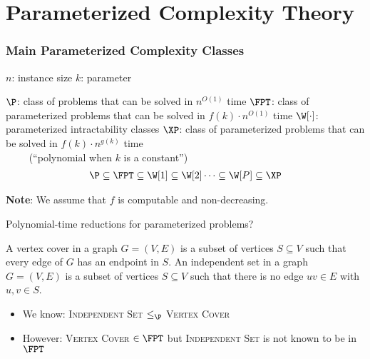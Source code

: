 



\section{Parameterized Complexity Theory}

\begin{frame}
	\frametitle{Main Parameterized Complexity Classes}
	
	\noindent
	$n$: instance size\newline
	$k$: parameter
	
	\medskip
	\noindent
	$\P$: class of problems that can be solved in $n^{O(1)}$ time\newline
	$\FPT$: class of parameterized problems that can be solved in $f(k) \cdot n^{O(1)}$ time\newline
	$\W[\cdot]$: parameterized intractability classes\newline
	$\XP$: class of parameterized problems that can be solved in $f(k) \cdot n^{g(k)}$ time\\ $\qquad$ (``polynomial when $k$ is a constant'')
	\slides{\medskip}
	\begin{align*}
	\P \subseteq \FPT \subseteq \W[1] \subseteq \W[2] \dots \subseteq \W[P]\subseteq \XP
	\end{align*}
	
	
	\smallskip
	\noindent
	\textbf{Note}: We assume that $f$ is \alert{computable} and \alert{non-decreasing}.
	
\end{frame}


\begin{frame}{Polynomial-time reductions for parameterized problems?}

 \noindent
 A \alert{vertex cover} in a graph $G=(V,E)$ is a subset of vertices $S\subseteq V$ such that every edge of $G$ has an endpoint in $S$.
%
 \noindent
 An \alert{independent set} in a graph $G=(V,E)$ is a subset of vertices $S\subseteq V$ such that there is no edge $uv\in E$ with $u,v\in S$.
 
 \pause
 \begin{itemize}
  \item We know: \textsc{Independent Set} $\le_\P$ \textsc{Vertex Cover}
  \item However: \textsc{Vertex Cover} $\in \FPT$ but \textsc{Independent Set} is not known to be in $\FPT$
 \end{itemize}

\end{frame}

